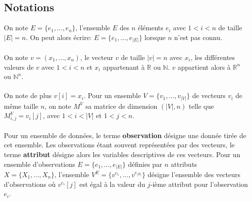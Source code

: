 \subsection{Notations}
On note $E=\{e_{1},...,e_{n}\}$, l'ensemble $E$ des $n$ éléments $e_{i}$ avec $1<i<n$ de taille $|E|=n$. On peut alors écrire: $E=\{e_{1},...,e_{|E|}\}$ lorsque $n$ n'est pas connu.\\
\\
On note $v=(x_{1},...,x_{n})$, le vecteur $v$ de taille $|v|=n$ avec $x_{i}$, les différentes valeurs de $v$ avec $1<i<n$ et $x_{i}$ appartenant à $\mathbb{R}$ ou $\mathbb{N}$. $v$ appartient alors à $\mathbb{R}^{n}$ ou $\mathbb{N}^{n}$.\\
\\
On note de plus $v[i]=x_{i}$. Pour un ensemble $V=\{v_{1},...,v_{|V|}\}$ de vecteurs $v_{i}$ de même taille $n$, on note $M^{V}$ sa matrice de dimension $(|V|,n)$ telle que $M^{V}_{i,j}=v_{i}[j]$, avec $1<i<|V|$ et $1<j<n$. \\
\\
Pour un ensemble de données, le terme \textbf{observation} désigne une donnée tirée de cet ensemble. Les observations étant souvent représentées par des vecteurs, le terme \textbf{attribut} désigne alors les variables descriptives de ces vecteurs. Pour un ensemble d'observations $E=\{e_{1},...,e_{|E|}\}$ définies par $n$ attributs $X=\{X_{1},...,X_{n}\}$, l'ensemble $V^{E}=\{v^{e_{1}},...,v^{e_{|E|}}\}$ désigne l'ensemble des vecteurs d'observations où $v^{e_{i}}[j]$ est égal à la valeur du $j$-ième attribut pour l'observation $e_{i}$. 


